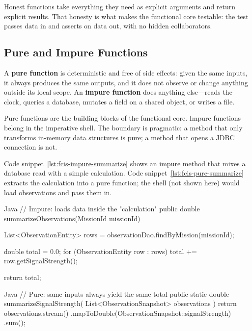 Honest functions take everything they need as explicit arguments and return explicit results. That honesty is what makes the functional core testable: the test passes data in and asserts on data out, with no hidden collaborators.

\subsection{Pure and Impure Functions}
\label{sec:fcis_pure_impure}

A \textbf{pure function} is deterministic and free of side effects: given the same inputs, it always produces the same outputs, and it does not observe or change anything outside its local scope. An \textbf{impure function} does anything else---reads the clock, queries a database, mutates a field on a shared object, or writes a file.

Pure functions are the building blocks of the functional core. Impure functions belong in the imperative shell. The boundary is pragmatic: a method that only transforms in-memory data structures is pure; a method that opens a JDBC connection is not.

Code snippet~\ref{lst:fcis-impure-summarize} shows an impure method that mixes a database read with a simple calculation. Code snippet~\ref{lst:fcis-pure-summarize} extracts the calculation into a pure function; the shell (not shown here) would load observations and pass them in.

\begin{ridercode}{Java}
// Impure: loads data inside the "calculation"
public double summarizeObservations(MissionId missionId)
{
    List<ObservationEntity> rows =
        observationDao.findByMission(missionId);

    double total = 0.0;
    for (ObservationEntity row : rows)
    {
        total += row.getSignalStrength();
    }

    return total;
}
\end{ridercode}
\label{lst:fcis-impure-summarize}

\begin{ridercode}{Java}
// Pure: same inputs always yield the same total
public static double summarizeSignalStrength(
    List<ObservationSnapshot> observations
)
{
    return observations.stream()
        .mapToDouble(ObservationSnapshot::signalStrength)
        .sum();
}
\end{ridercode}
\label{lst:fcis-pure-summarize}

